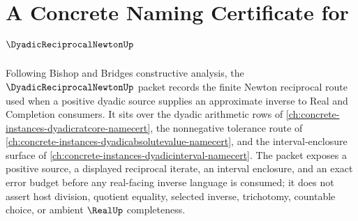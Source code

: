 \chapter{A Concrete Naming Certificate for $\DyadicReciprocalNewtonUp$}
\label{ch:concrete-instances-dyadic-reciprocal-newton-namecert}

Following Bishop and Bridges constructive analysis, the $\DyadicReciprocalNewtonUp$ packet records the finite Newton reciprocal route used when a positive dyadic source supplies an approximate inverse to Real and Completion consumers. It sits over the dyadic arithmetic rows of \autoref{ch:concrete-instances-dyadicratcore-namecert}, the nonnegative tolerance route of \autoref{ch:concrete-instances-dyadicabsolutevalue-namecert}, and the interval-enclosure surface of \autoref{ch:concrete-instances-dyadicinterval-namecert}. The packet exposes a positive source, a displayed reciprocal iterate, an interval enclosure, and an exact error budget before any real-facing inverse language is consumed; it does not assert host division, quotient equality, selected inverse, trichotomy, countable choice, or ambient $\RealUp$ completeness.

